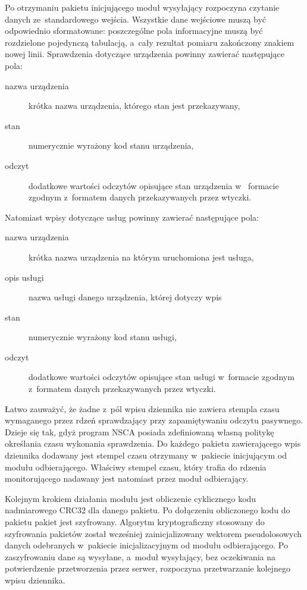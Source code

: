 Po otrzymaniu pakietu inicjującego moduł wysyłający rozpoczyna
czytanie danych ze~standardowego wejścia. Wszystkie dane wejściowe
muszą być odpowiednio sformatowane: poszczególne pola informacyjne
muszą być rozdzielone pojedynczą tabulacją, a~cały rezultat pomiaru
zakończony znakiem nowej linii. Sprawdzenia dotyczące urządzenia
powinny zawierać następujące pola:

\begin{description}
\item[nazwa urządzenia] krótka nazwa urządzenia, którego stan jest
  przekazywany,
\item[stan] numerycznie wyrażony kod stanu urządzenia,
\item[odczyt] dodatkowe wartości odczytów opisujące stan urządzenia w~
  formacie zgodnym z~formatem danych przekazywanych przez wtyczki.
\end{description}

Natomiast wpisy dotyczące usług powinny zawierać następujące pola:

\begin{description}
\item[nazwa urządzenia] krótka nazwa urządzenia na którym uruchomiona
  jest usługa,
\item[opis usługi] nazwa usługi danego urządzenia, której dotyczy wpis
\item[stan] numerycznie wyrażony kod stanu usługi,
\item[odczyt] dodatkowe wartości odczytów opisujące stan usługi
  w~formacie zgodnym z~formatem danych przekazywanych przez wtyczki.
\end{description}

Łatwo zauważyć, że żadne z~pól wpisu dziennika nie zawiera stempla
czasu wymaganego przez rdzeń sprawdzający przy zapamiętywaniu odczytu
pasywnego. Dzieje się tak, gdyż program NSCA posiada zdefiniowaną
własną politykę określania czasu wykonania sprawdzenia. Do każdego
pakietu zawierającego wpis dziennika dodawany jest stempel czasu
otrzymany w~pakiecie inicjującym od modułu odbierającego. Właściwy
stempel czasu, który trafia do rdzenia monitorującego nadawany jest
natomiast przez moduł odbierający.

Kolejnym krokiem działania modułu jest obliczenie cyklicznego kodu
nadmiarowego CRC32 dla danego pakietu. Po dołączeniu obliczonego kodu
do pakietu pakiet jest szyfrowany. Algorytm kryptograficzny stosowany do
szyfrowania pakietów został wcześniej zainicjalizowany wektorem
pseudolosowych danych odebranych w~pakiecie inicjalizacyjnym od modułu
odbierającego. Po zaszyfrowaniu dane są wysyłane, a~moduł wysyłający,
bez oczekiwania na potwierdzenie przetworzenia przez serwer,
rozpoczyna przetwarzanie kolejnego wpisu dziennika.


